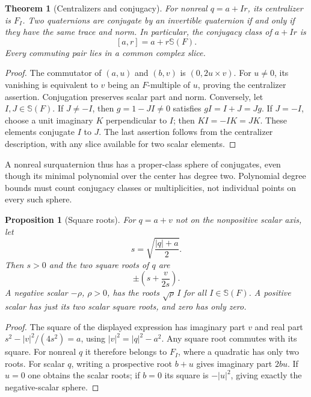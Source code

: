 \documentclass[11pt,letterpaper]{article}
\numberwithin{equation}{section}
\newtheorem{theorem}{Theorem}[section]
\newtheorem{proposition}[proposition]{Proposition}
\theoremstyle{definition}
\theoremstyle{remark}
\begin{document}
\begin{theorem}[Centralizers and conjugacy]\label{thm:conjugacy}
For nonreal $q=a+Ir$, its centralizer is $F_I$. Two quaternions are conjugate by an invertible
quaternion if and only if they have the same trace and norm. In particular, the conjugacy
class of $a+Ir$ is
\[
 [a,r]=a+r\mathbb S(F).
\]
Every commuting pair lies in a common complex slice.
\end{theorem}
\begin{proof}
The commutator of $(a,u)$ and $(b,v)$ is $(0,2u\times v)$. For $u\ne0$, its vanishing is
equivalent to $v$ being an $F$-multiple of $u$, proving the centralizer assertion.
Conjugation preserves scalar part and norm. Conversely, let $I,J\in\mathbb S(F)$.
If $J\ne-I$, then $g=1-JI\ne0$ satisfies
$gI=I+J=Jg$. If $J=-I$, choose a unit imaginary $K$ perpendicular to $I$; then
$KI=-IK=JK$. These elements conjugate $I$ to $J$. The last assertion follows from the
centralizer description, with any slice available for two scalar elements.
\end{proof}

A nonreal surquaternion thus has a proper-class sphere of conjugates, even though its minimal
polynomial over the center has degree two. Polynomial degree bounds must count conjugacy
classes or multiplicities, not individual points on every such sphere.

\begin{proposition}[Square roots]\label{prop:sqrt}
For $q=a+v$ not on the nonpositive scalar axis, let
\[
 s=\sqrt{\frac{|q|+a}{2}}.
\]
Then $s>0$ and the two square roots of $q$ are
\begin{equation}\label{eq:sqrt}
 \pm\left(s+\frac{v}{2s}\right).
\end{equation}
A negative scalar $-\rho$, $\rho>0$, has the roots
$\sqrt\rho\,I$ for all $I\in\mathbb S(F)$. A positive scalar has just its two scalar
square roots, and zero has only zero.
\end{proposition}
\begin{proof}
The square of the displayed expression has imaginary part $v$ and real part
$s^2-|v|^2/(4s^2)=a$, using $|v|^2=|q|^2-a^2$.
Any square root commutes with its square. For nonreal $q$ it therefore belongs to $F_I$,
where a quadratic has only two roots. For scalar $q$, writing a prospective root $b+u$
gives imaginary part $2bu$. If $u=0$ one obtains the scalar roots; if $b=0$ its square is
$-|u|^2$, giving exactly the negative-scalar sphere.
\end{proof}
\end{document}
